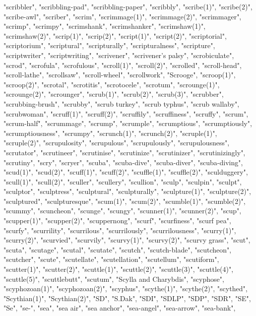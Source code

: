 "scribbler",
"scribbling-pad",
"scribbling-paper",
"scribbly",
"scribe(1)",
"scribe(2)",
"scribe-awl",
"scriber",
"scrim",
"scrimmage(1)",
"scrimmage(2)",
"scrimmager",
"scrimp",
"scrimpy",
"scrimshank",
"scrimshanker",
"scrimshaw(1)",
"scrimshaw(2)",
"scrip(1)",
"scrip(2)",
"script(1)",
"script(2)",
"scriptorial",
"scriptorium",
"scriptural",
"scripturally",
"scripturalness",
"scripture",
"scriptwriter",
"scriptwriting",
"scrivener",
"scrivener's palsy",
"scrobiculate",
"scrod",
"scrofula",
"scrofulous",
"scroll(1)",
"scroll(2)",
"scrolled",
"scroll-head",
"scroll-lathe",
"scrollsaw",
"scroll-wheel",
"scrollwork",
"Scrooge",
"scroop(1)",
"scroop(2)",
"scrotal",
"scrotitis",
"scrotocele",
"scrotum",
"scrounge(1)",
"scrounge(2)",
"scrounger",
"scrub(1)",
"scrub(2)",
"scrub(3)",
"scrubber",
"scrubbing-brush",
"scrubby",
"scrub turkey",
"scrub typhus",
"scrub wallaby",
"scrubwoman",
"scruff(1)",
"scruff(2)",
"scruffily",
"scruffiness",
"scruffy",
"scrum",
"scrum-half",
"scrummage",
"scrump",
"scrumple",
"scrumptious",
"scrumptiously",
"scrumptiousness",
"scrumpy",
"scrunch(1)",
"scrunch(2)",
"scruple(1)",
"scruple(2)",
"scrupulosity",
"scrupulous",
"scrupulously",
"scrupulousness",
"scrutator",
"scrutineer",
"scrutinise",
"scrutinize",
"scrutinizer",
"scrutinizingly",
"scrutiny",
"scry",
"scryer",
"scuba",
"scuba-dive",
"scuba-diver",
"scuba-diving",
"scud(1)",
"scud(2)",
"scuff(1)",
"scuff(2)",
"scuffle(1)",
"scuffle(2)",
"sculduggery",
"scull(1)",
"scull(2)",
"sculler",
"scullery",
"scullion",
"sculp",
"sculpin",
"sculpt",
"sculptor",
"sculptress",
"sculptural",
"sculpturally",
"sculpture(1)",
"sculpture(2)",
"sculptured",
"sculpturesque",
"scum(1)",
"scum(2)",
"scumble(1)",
"scumble(2)",
"scummy",
"scuncheon",
"scunge",
"scungy",
"scunner(1)",
"scunner(2)",
"scup",
"scupper(1)",
"scupper(2)",
"scuppernong",
"scurf",
"scurfiness",
"scurf pea",
"scurfy",
"scurrility",
"scurrilous",
"scurrilously",
"scurrilousness",
"scurry(1)",
"scurry(2)",
"scurvied",
"scurvily",
"scurvy(1)",
"scurvy(2)",
"scurvy grass",
"scut",
"scuta",
"scutage",
"scutal",
"scutate",
"scutch",
"scutch-blade",
"scutcheon",
"scutcher",
"scute",
"scutellate",
"scutellation",
"scutellum",
"scutiform",
"scutter(1)",
"scutter(2)",
"scuttle(1)",
"scuttle(2)",
"scuttle(3)",
"scuttle(4)",
"scuttle(5)",
"scuttlebutt",
"scutum",
"Scylla and Charybdis",
"scyphose",
"scyphozoan(1)",
"scyphozoan(2)",
"scyphus",
"scythe(1)",
"scythe(2)",
"scythed",
"Scythian(1)",
"Scythian(2)",
"SD",
"S.Dak",
"SDI",
"SDLP",
"SDP",
"SDR",
"SE",
"Se",
"se-",
"sea",
"sea air",
"sea anchor",
"sea-angel",
"sea-arrow",
"sea-bank",
